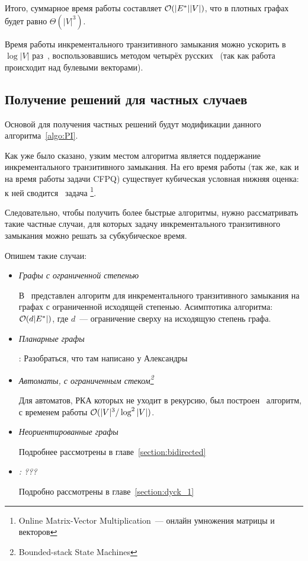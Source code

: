 Итого, суммарное время работы составляет $\mathcal{O}(|E^{*}||V|)$, что в плотных графах будет равно $\Theta(|V|^3)$. 

\begin{note}
  Время работы инкрементального транзитивного замыкания можно ускорить в $\log |V|$ раз~\cite{Shemetova21}, воспользовавшись методом четырёх русских~\cite{Arlazarov70} (так как работа происходит над булевыми векторами).
\end{note}

\subsection{Получение решений для частных случаев}

Основой для получения частных решений будут модификации данного алгоритма~\ref{algo:PI}.

Как уже было сказано, узким местом алгоритма является поддержание инкрементального транзитивного замыкания. На его время работы (так же, как и на время работы задачи CFPQ) существует кубическая условная нижняя оценка: к ней сводится~\cite{Henzinger15} задача \footnote{Online Matrix-Vector Multiplication~--- онлайн умножения матрицы и векторов}. 

Следовательно, чтобы получить более быстрые алгоритмы, нужно рассматривать такие частные случаи, для которых задачу инкрементального транзитивного замыкания можно решать за субкубическое время.

Опишем такие случаи:

\begin{itemize}
  \item \textit{Графы с ограниченной степенью}

    В~\cite{Yellin1993} представлен алгоритм для инкрементального транзитивного замыкания на графах с ограниченной исходящей степенью. Асимптотика алгоритма: $\mathcal{O}(d |E^{*}|)$, где $d$~--- ограничение сверху на исходящую степень графа.

  \item \textit{Планарные графы}

    \TODO: Разобраться, что там написано у Александры 
  
  \item \textit{Автоматы, с ограниченным стеком\footnote{Bounded-stack State Machines}~\cite{Chaudhuri08}}

    Для автоматов, РКА которых не уходит в рекурсию, был построен~\cite{Chaudhuri08} алгоритм, с временем работы $\mathcal{O}(|V|^3 / \log^2 |V|)$.

  \item \textit{Неориентированные графы}

    Подробнее рассмотрены в главе~\ref{section:bidirected}

  \item \textit{\TODO: ???}
    
    Подробно рассмотрены в главе~\ref{section:dyck_1}

\end{itemize}

